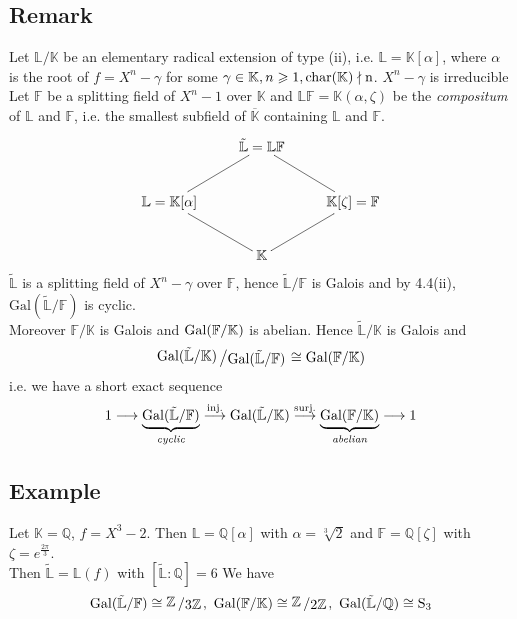 \documentclass[12pt]{book}
\newcommand{\slant}[2]{{\raisebox{.1em}{$#1$}\left/\raisebox{-.1em}{$#2$}\right.}}
\begin{document}
\begin{spacing}{1.3}
\subsection{Remark} %
Let $\mathbb{L}/\mathbb{K}$ be an elementary radical extension of type (ii), i.e. $\mathbb{L}=\mathbb{K}[\alpha]$, where $\alpha$ is the root of $f=X^n-\gamma$ for some $\gamma \in \mathbb{K}, n \geqslant 1, \rm{char}(\mathbb{K}) \nmid n$. $X^n-\gamma$ is irreducible\\
Let $\mathbb{F}$ be a splitting field of $X^n-1$ over $\mathbb{K}$ and $\mathbb{L}\mathbb{F}=\mathbb{K}(\alpha, \zeta)$ be the \textit{compositum} of $\mathbb{L}$ and $\mathbb{F}$, i.e. the smallest subfield of $\overline{\mathbb{K}}$ containing $\mathbb{L}$ and $\mathbb{F}$. 
$$\begin{xy}
\xymatrix{
&\tilde{\mathbb{L}}=\mathbb{L}\mathbb{F} &\\
\mathbb{L}=\mathbb{K}[\alpha] \ar@{-}[ru] && \mathbb{K}[\zeta]=\mathbb{F} \ar@{-}[lu] \\
& \mathbb{K} \ar@{-}[lu] \ar@{-}[ru]&
}
\end{xy}$$
$\tilde{\mathbb{L}}$ is a splitting field of $X^n-\gamma$ over $\mathbb{F}$, hence $\tilde{\mathbb{L}}/\mathbb{F}$ is Galois and by 4.4(ii), $\textrm{Gal}(\tilde{\mathbb{L}}/\mathbb{F})$ is cyclic.\\
Moreover $\mathbb{F}/\mathbb{K}$ is Galois and $\rm{Gal}(\mathbb{F}/\mathbb{K})$ is abelian. Hence $\tilde{\mathbb{L}}/\mathbb{K}$ is Galois and\\$$\slant{\textrm{Gal}(\tilde{\mathbb{L}}/\mathbb{K})}{\textrm{Gal}(\tilde{\mathbb{L}}/\mathbb{F})} \cong \textrm{Gal}(\mathbb{F}/\mathbb{K})$$
i.e. we have a short exact sequence
$$1 \longrightarrow \underbrace{\rm{Gal}(\tilde{\mathbb{L}}/\mathbb{F})}_{\textit{cyclic}} \overset{\textrm{inj.}}{\longrightarrow} \textrm{Gal}(\tilde{\mathbb{L}}/\mathbb{K}) \overset{\textrm{surj.}}{\longrightarrow} \underbrace{\textrm{Gal}(\mathbb{F}/\mathbb{K})}_{\textit{abelian}} \longrightarrow 1$$

\subsection*{Example} %
\titleformat{\subsection}{\normalfont\normalsize\bfseries}{}{0em}{#1 \thesubsection}
Let $\mathbb{K}=\mathbb{Q}$, $f=X^3-2$. Then $\mathbb{L}=\mathbb{Q}[\alpha]$ with $\alpha=\sqrt[3]{2}$ and $\mathbb{F}=\mathbb{Q}[\zeta]$ with $\zeta=e^{\frac{2\pi}{3}}$.\\
Then $\tilde{\mathbb{L}}=\mathbb{L}(f)$ with $[\tilde{\mathbb{L}}:\mathbb{Q}]=6$ We have $$\rm{Gal}(\tilde{\mathbb{L}}/\mathbb{F}) \cong \slant{\mathbb{Z}}{3 \mathbb{Z}}, \textrm{ } \rm{Gal}(\mathbb{F}/\mathbb{K}) \cong \slant{\mathbb{Z}}{2 \mathbb{Z}}, \textrm{ } \rm{Gal}(\tilde{\mathbb{L}}/\mathbb{Q}) \cong S_3$$


\end{spacing}
\end{document}
